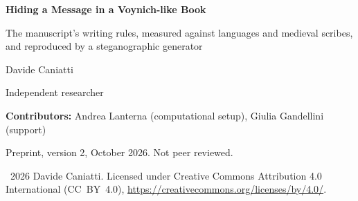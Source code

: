 \documentclass[11pt,a4paper]{article}
\begin{document}
\begin{center}
{\LARGE\bfseries Hiding a Message in a Voynich-like Book\par}
\vspace{0.4em}
{\large The manuscript's writing rules, measured against languages and medieval scribes,\\
and reproduced by a steganographic generator\par}
\vspace{1.2em}
{\large Davide Caniatti\par}
\vspace{0.3em}
{\small Independent researcher\par}
\vspace{0.6em}
{\small \textbf{Contributors:} Andrea Lanterna (computational setup), Giulia Gandellini (support)\par}
\vspace{0.4em}
{\small Preprint, version 2, October 2026. Not peer reviewed.\par}
\vspace{0.2em}
{\footnotesize \textcopyright\ 2026 Davide Caniatti. Licensed under Creative Commons Attribution 4.0 International
(CC~BY~4.0), \url{https://creativecommons.org/licenses/by/4.0/}.\par}
\end{center}
\end{document}
